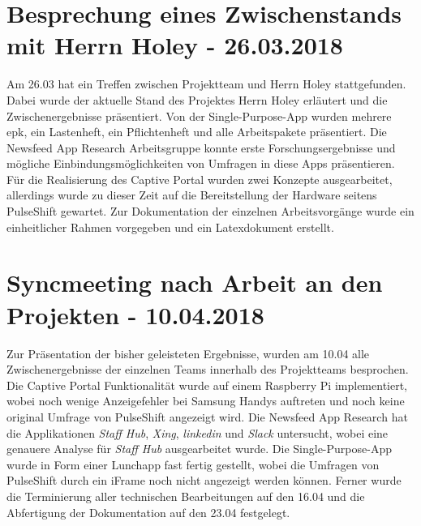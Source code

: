 \section{Besprechung eines Zwischenstands mit Herrn Holey - 26.03.2018}
Am 26.03 hat ein Treffen zwischen Projektteam und Herrn Holey stattgefunden. Dabei wurde der aktuelle Stand des Projektes Herrn Holey erläutert und die Zwischenergebnisse präsentiert. Von der Single-Purpose-App wurden mehrere \gls{epk}, ein Lastenheft, ein Pflichtenheft und alle Arbeitspakete präsentiert. Die Newsfeed App Research Arbeitsgruppe konnte erste Forschungsergebnisse und mögliche Einbindungsmöglichkeiten von Umfragen in diese Apps präsentieren. Für die Realisierung des Captive Portal wurden zwei Konzepte ausgearbeitet, allerdings wurde zu dieser Zeit auf die Bereitstellung der Hardware seitens PulseShift gewartet. Zur Dokumentation der einzelnen Arbeitsvorgänge wurde ein einheitlicher Rahmen vorgegeben und ein Latexdokument erstellt.

\section{Syncmeeting nach Arbeit an den Projekten - 10.04.2018}
Zur Präsentation der bisher geleisteten Ergebnisse, wurden am 10.04 alle Zwischenergebnisse der einzelnen Teams innerhalb des Projektteams besprochen. Die Captive Portal Funktionalität wurde auf einem Raspberry Pi implementiert, wobei noch wenige Anzeigefehler bei Samsung Handys auftreten und noch keine original Umfrage von PulseShift angezeigt wird. Die Newsfeed App Research hat die Applikationen \textit{Staff Hub}, \textit{Xing}, \textit{linkedin} und \textit{Slack} untersucht, wobei eine genauere Analyse für \textit{Staff Hub} ausgearbeitet wurde. Die Single-Purpose-App wurde in Form einer Lunchapp fast fertig gestellt, wobei die Umfragen von PulseShift durch ein iFrame noch nicht angezeigt werden können. Ferner wurde die Terminierung aller technischen Bearbeitungen auf den 16.04 und die Abfertigung der Dokumentation auf den 23.04 festgelegt.